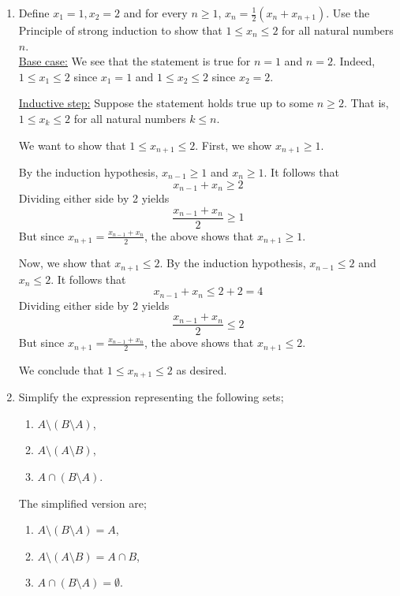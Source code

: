 \documentclass[12pt, reqno]{article}
\numberwithin{equation}{section}
\theoremstyle{definition}
\theoremstyle{remark}
\begin{document}
\begin{enumerate}[leftmargin=*]
	\item Define $x_1 = 1, x_2=2$ and for every $n\geq 1$, $x_n = \frac{1}{2}(x_n+x_{n+1})$. Use the Principle of strong induction to show that $1\leq x_n \leq 2$ for all natural numbers $n$. \\

	      \noindent\underline{Base case:} We see that the statement is true for $n=1$ and $n=2$. Indeed, $1 \leq x_1\leq 2$ since $x_1=1$ and $1\leq x_2\leq 2$ since $x_2=2$.

	      \noindent\underline{Inductive step:} Suppose the statement holds true up to some $n\geq 2$. That is, $1\leq x_k \leq 2$ for all natural numbers $k \leq n$.

	      We want to show that $1\leq x_{n+1} \leq 2$. First, we show $x_{n+1}\geq 1$.

	      By the induction hypothesis, $x_{n-1} \geq 1$ and $x_n \geq 1$. It follows that
	      \[
		      x_{n-1} + x_n \geq 2
	      \]
	      Dividing either side by 2 yields
	      \[
		      \frac{x_{n-1} + x_n}{2}\geq 1
	      \]
	      But since $x_{n+1} = \frac{x_{n-1} + x_n}{2}$, the above shows that $x_{n+1}\geq 1$.

	      Now, we show that $x_{n+1} \leq 2$. By the induction hypothesis, $x_{n-1} \leq 2$ and $x_n \leq 2$. It follows that
	      \[
		      x_{n-1} + x_n \leq 2 + 2 = 4
	      \]
	      Dividing either side by 2 yields
	      \[
		      \frac{x_{n-1} + x_n}{2}\leq 2
	      \]
	      But since $x_{n+1} = \frac{x_{n-1} + x_n}{2}$, the above shows that $x_{n+1}\leq 2$.

	      We conclude that $1\leq x_{n+1} \leq 2$ as desired.

	\item Simplify the expression representing the following sets;
	      \begin{enumerate}
		      \item $A\setminus (B\setminus A)$,
		      \item $A\setminus (A\setminus B)$,
		      \item $A\cap (B\setminus A)$.
	      \end{enumerate}

	      The simplified version are;
	      \begin{enumerate}
		      \item $A\setminus (B\setminus A) = A$,
		      \item $A\setminus (A\setminus B) = A\cap B$,
		      \item $A\cap (B\setminus A) = \emptyset$.
	      \end{enumerate}


\end{enumerate}
\end{document}
